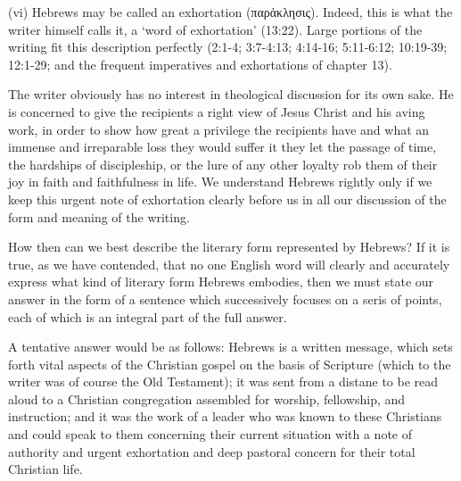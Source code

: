 (vi) Hebrews may be called an exhortation (παρἀκλησις).
Indeed, this is what the writer himself calls it, a `word of exhortation'
(13:22).
Large portions of the writing fit this description perfectly (2:1-4; 3:7-4:13;
4:14-16; 5:11-6:12; 10:19-39; 12:1-29; and the frequent imperatives and
exhortations of chapter 13).
\newline

The writer obviously has no interest in theological discussion for its own sake.
He is concerned to give the recipients a right view of Jesus Christ and his
aving work, in order to show how great a privilege the recipients have and what
an immense and irreparable loss they would suffer it they let the passage of
time, the hardships of discipleship, or the lure of any other loyalty rob them
of their joy in faith and faithfulness in life.
We understand Hebrews rightly only if we keep this urgent note of exhortation
clearly before us in all our discussion of the form and meaning of the writing.
\newline

How then can we best describe the literary form represented by Hebrews?
If it is true, as we have contended, that no one English word will clearly and
accurately express what kind of literary form Hebrews embodies, then we must
state our answer in the form of a sentence which successively focuses on a seris
of points, each of which is an integral part of the full answer.
\newline

A tentative answer would be as follows: Hebrews is a written message, which sets
forth vital aspects of the Christian gospel on the basis of Scripture (which to
the writer was of course the Old Testament); it was sent from a distane to be
read aloud to a Christian congregation assembled for worship, fellowship, and
instruction; and it was the work of a leader who was known to these Christians
and could speak to them concerning their current situation with a note of
authority and urgent exhortation and deep pastoral concern for their total
Christian life.
